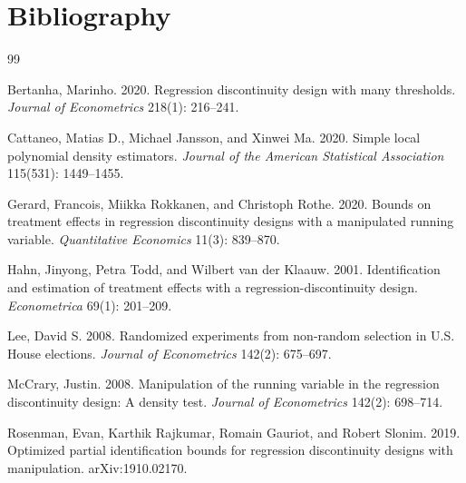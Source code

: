 \documentclass[11pt]{article}
\theoremstyle{definition}
\theoremstyle{plain}
\theoremstyle{remark}
\begin{document}
\section*{Bibliography}
\begin{thebibliography}{99}

Bertanha, Marinho.
2020.
Regression discontinuity design with many thresholds.
\emph{Journal of Econometrics} 218(1): 216--241.

Cattaneo, Matias D., Michael Jansson, and Xinwei Ma.
2020.
Simple local polynomial density estimators.
\emph{Journal of the American Statistical Association} 115(531): 1449--1455.

Gerard, Francois, Miikka Rokkanen, and Christoph Rothe.
2020.
Bounds on treatment effects in regression discontinuity designs with a manipulated running variable.
\emph{Quantitative Economics} 11(3): 839--870.

Hahn, Jinyong, Petra Todd, and Wilbert van der Klaauw.
2001.
Identification and estimation of treatment effects with a regression-discontinuity design.
\emph{Econometrica} 69(1): 201--209.

Lee, David S.
2008.
Randomized experiments from non-random selection in U.S. House elections.
\emph{Journal of Econometrics} 142(2): 675--697.

McCrary, Justin.
2008.
Manipulation of the running variable in the regression discontinuity design: A density test.
\emph{Journal of Econometrics} 142(2): 698--714.

Rosenman, Evan, Karthik Rajkumar, Romain Gauriot, and Robert Slonim.
2019.
Optimized partial identification bounds for regression discontinuity designs with manipulation.
arXiv:1910.02170.

\end{thebibliography}
\end{document}
